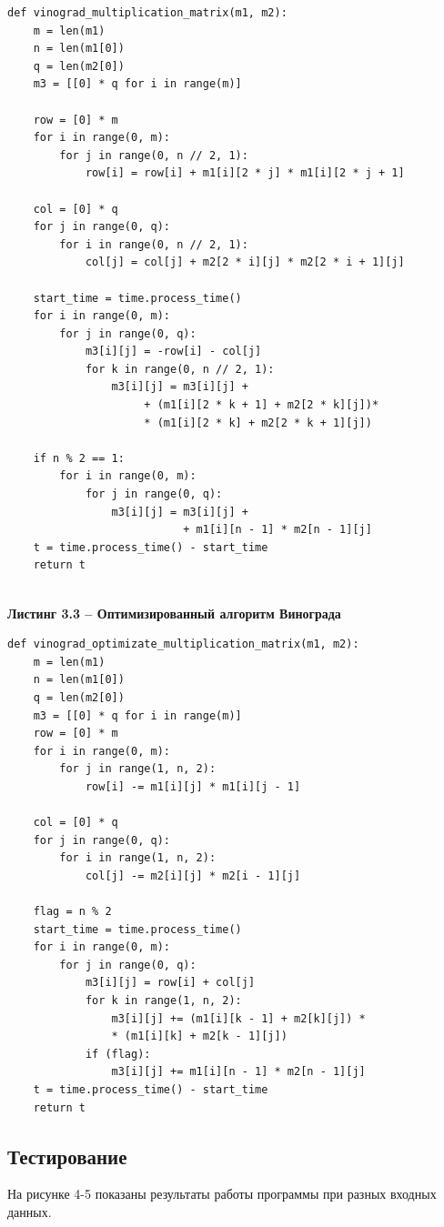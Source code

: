 \documentclass[a4paper,12pt]{article}
\begin{document}
	\begin{lstlisting}
def vinograd_multiplication_matrix(m1, m2):
	m = len(m1)   
	n = len(m1[0])   
	q = len(m2[0]) 
	m3 = [[0] * q for i in range(m)]
	
	row = [0] * m
	for i in range(0, m):
		for j in range(0, n // 2, 1):
			row[i] = row[i] + m1[i][2 * j] * m1[i][2 * j + 1]
	
	col = [0] * q
	for j in range(0, q):
		for i in range(0, n // 2, 1):
			col[j] = col[j] + m2[2 * i][j] * m2[2 * i + 1][j]
	
	start_time = time.process_time()
	for i in range(0, m):
		for j in range(0, q):
			m3[i][j] = -row[i] - col[j]
			for k in range(0, n // 2, 1):
				m3[i][j] = m3[i][j] + 
				     + (m1[i][2 * k + 1] + m2[2 * k][j])*
				     * (m1[i][2 * k] + m2[2 * k + 1][j])
	
	if n % 2 == 1:
		for i in range(0, m):
			for j in range(0, q):
				m3[i][j] = m3[i][j] + 
				           + m1[i][n - 1] * m2[n - 1][j]       
	t = time.process_time() - start_time
	return t
	\end{lstlisting}
	
	\textbf{\\Листинг 3.3 -- Оптимизированный алгоритм Винограда}
	
	\begin{lstlisting}
def vinograd_optimizate_multiplication_matrix(m1, m2):
	m = len(m1)
	n = len(m1[0])
	q = len(m2[0])
	m3 = [[0] * q for i in range(m)]
	row = [0] * m
	for i in range(0, m):
		for j in range(1, n, 2):
			row[i] -= m1[i][j] * m1[i][j - 1]
	
	col = [0] * q
	for j in range(0, q):
		for i in range(1, n, 2):
			col[j] -= m2[i][j] * m2[i - 1][j]
	
	flag = n % 2
	start_time = time.process_time()
	for i in range(0, m):
		for j in range(0, q):
			m3[i][j] = row[i] + col[j]
			for k in range(1, n, 2):
				m3[i][j] += (m1[i][k - 1] + m2[k][j]) *
				* (m1[i][k] + m2[k - 1][j])
			if (flag):
				m3[i][j] += m1[i][n - 1] * m2[n - 1][j]
	t = time.process_time() - start_time
	return t
	\end{lstlisting}
	
	\subsection{Тестирование}
	\hfill
	
	На рисунке 4-5 показаны результаты работы программы при разных входных данных.
	
\end{document}

